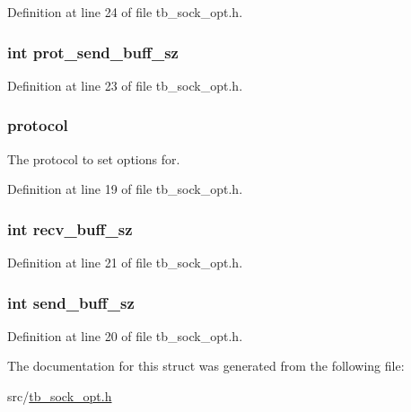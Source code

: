Definition at line 24 of file tb\-\_\-sock\-\_\-opt.\-h.

\hypertarget{structtb__option__t_a1c242d6f62d995282dbeddfaac2a1890}{
\subsubsection[{prot\-\_\-send\-\_\-buff\-\_\-sz}]{\setlength{\rightskip}{0pt plus 5cm}int prot\-\_\-send\-\_\-buff\-\_\-sz}}\label{structtb__option__t_a1c242d6f62d995282dbeddfaac2a1890}


Definition at line 23 of file tb\-\_\-sock\-\_\-opt.\-h.

\hypertarget{structtb__option__t_a0d2276cd987e688180eedab183cd503e}{
\subsubsection[{protocol}]{ protocol}}\label{structtb__option__t_a0d2276cd987e688180eedab183cd503e}


The protocol to set options for. 



Definition at line 19 of file tb\-\_\-sock\-\_\-opt.\-h.

\hypertarget{structtb__option__t_add6d14b73b59cd3d20c96e90a661c84e}{
\subsubsection[{recv\-\_\-buff\-\_\-sz}]{\setlength{\rightskip}{0pt plus 5cm}int recv\-\_\-buff\-\_\-sz}}\label{structtb__option__t_add6d14b73b59cd3d20c96e90a661c84e}


Definition at line 21 of file tb\-\_\-sock\-\_\-opt.\-h.

\hypertarget{structtb__option__t_af5339380e8b662fd25ed22b300026ee1}{
\subsubsection[{send\-\_\-buff\-\_\-sz}]{\setlength{\rightskip}{0pt plus 5cm}int send\-\_\-buff\-\_\-sz}}\label{structtb__option__t_af5339380e8b662fd25ed22b300026ee1}


Definition at line 20 of file tb\-\_\-sock\-\_\-opt.\-h.



The documentation for this struct was generated from the following file\-:\begin{DoxyCompactItemize}
\item 
src/\hyperlink{tb__sock__opt_8h}{tb\-\_\-sock\-\_\-opt.\-h}\end{DoxyCompactItemize}

